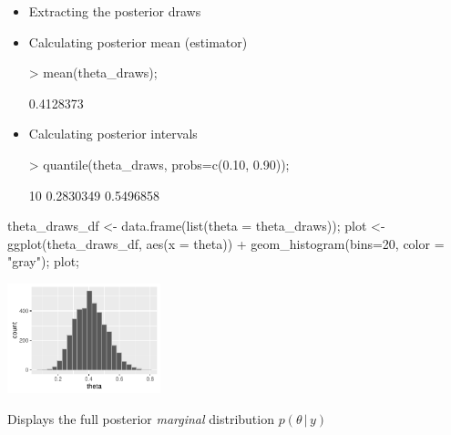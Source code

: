 \documentclass[10pt]{report}
\begin{document}
%
\begin{itemize}
\item Extracting the posterior draws
\item Calculating posterior mean (estimator)
\begin{codein}
> mean(theta_draws);
\end{codein}
\begin{codeout}
[1] 0.4128373
\end{codeout}
\item Calculating posterior intervals
\begin{codein}
> quantile(theta_draws, probs=c(0.10, 0.90));
\end{codein}
\begin{codeout}
      10%
0.2830349 0.5496858
\end{codeout}
\end{itemize}




%
\begin{codein}
theta_draws_df <- data.frame(list(theta = theta_draws));
plot <-
  ggplot(theta_draws_df, aes(x = theta)) +
  geom_histogram(bins=20, color = "gray");
plot;
\end{codein}
\vspace*{-9pt}
\begin{center}
\includegraphics[height=1.25in]{img/bern-posterior-histogram.pdf}
\end{center}
\vspace*{-0.1in}
\begin{subitemize}
\item
Displays the full posterior {\slshape marginal} distribution $p(\theta \,
| \, y)$
\end{subitemize}
\end{document}
